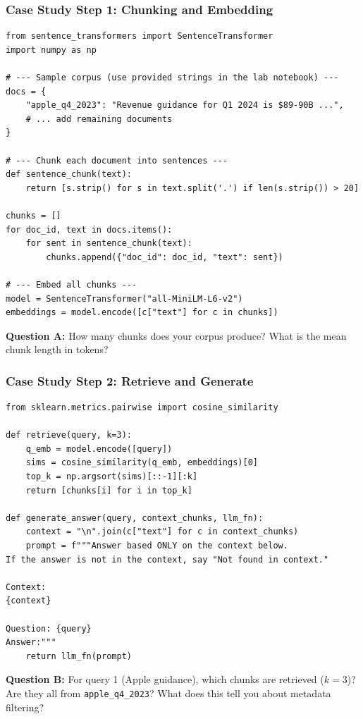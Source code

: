 \documentclass[9pt,t]{beamer}
\begin{document}
\begin{frame}[fragile]
\frametitle{Case Study Step 1: Chunking and Embedding}

\begin{lstlisting}[basicstyle=\ttfamily\scriptsize]
from sentence_transformers import SentenceTransformer
import numpy as np

# --- Sample corpus (use provided strings in the lab notebook) ---
docs = {
    "apple_q4_2023": "Revenue guidance for Q1 2024 is $89-90B ...",
    # ... add remaining documents
}

# --- Chunk each document into sentences ---
def sentence_chunk(text):
    return [s.strip() for s in text.split('.') if len(s.strip()) > 20]

chunks = []
for doc_id, text in docs.items():
    for sent in sentence_chunk(text):
        chunks.append({"doc_id": doc_id, "text": sent})

# --- Embed all chunks ---
model = SentenceTransformer("all-MiniLM-L6-v2")
embeddings = model.encode([c["text"] for c in chunks])
\end{lstlisting}

\medskip
\textbf{Question A:} How many chunks does your corpus produce?
What is the mean chunk length in tokens?
\end{frame}

\begin{frame}[fragile]
\frametitle{Case Study Step 2: Retrieve and Generate}

\begin{lstlisting}[basicstyle=\ttfamily\scriptsize]
from sklearn.metrics.pairwise import cosine_similarity

def retrieve(query, k=3):
    q_emb = model.encode([query])
    sims = cosine_similarity(q_emb, embeddings)[0]
    top_k = np.argsort(sims)[::-1][:k]
    return [chunks[i] for i in top_k]

def generate_answer(query, context_chunks, llm_fn):
    context = "\n".join(c["text"] for c in context_chunks)
    prompt = f"""Answer based ONLY on the context below.
If the answer is not in the context, say "Not found in context."

Context:
{context}

Question: {query}
Answer:"""
    return llm_fn(prompt)
\end{lstlisting}

\medskip
\textbf{Question B:} For query 1 (Apple guidance), which chunks are retrieved ($k=3$)?
Are they all from \texttt{apple\_q4\_2023}? What does this tell you about metadata filtering?
\end{frame}
\end{document}
